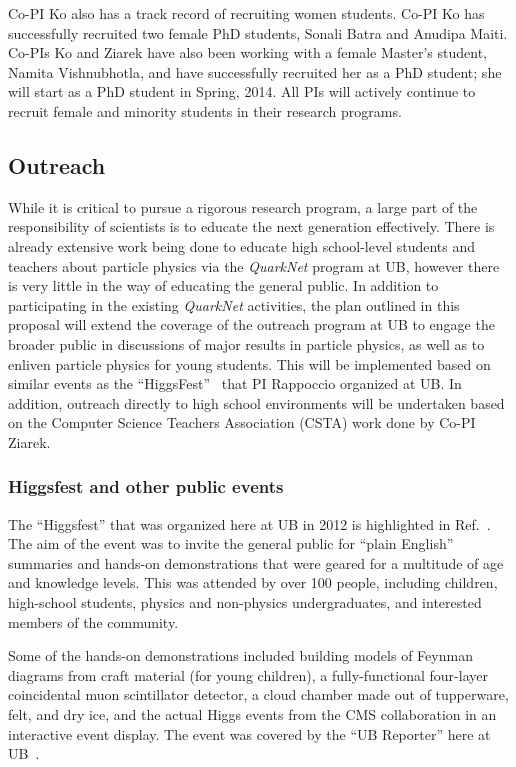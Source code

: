 \documentclass[times,11pt]{article}
\begin{document}
Co-PI Ko also has a track record of recruiting women students. Co-PI Ko has
successfully recruited two female PhD students, Sonali Batra and Anudipa
Maiti. Co-PIs Ko and Ziarek have also been working with a female Master's
student, Namita Vishnubhotla, and have successfully recruited her as a PhD
student; she will start as a PhD student in Spring, 2014. All PIs will
actively continue to recruit female and minority students in their research
programs.

\subsection{Outreach}

While it is critical to pursue a rigorous research program, a large
part of the responsibility of scientists is to educate the next
generation effectively. There is already extensive work being done to
educate high school-level students and teachers about particle physics
via the {\em QuarkNet}
program  at UB, however there is
very little in the way of educating the general
public. 
In addition to participating in the existing {\em QuarkNet}
activities, the plan outlined in this proposal will extend the coverage of the
outreach program at UB to engage the broader
public in discussions of major results in particle
physics, as well as to enliven particle physics for young students. 
This will be implemented based on similar events as the
``HiggsFest''~\cite{higgsfest} that PI Rappoccio organized at UB. 
In addition, outreach directly to high school environments will be
undertaken based on the Computer Science Teachers Association (CSTA)
work done by Co-PI Ziarek. 


\subsubsection{Higgsfest and other public events}

The ``Higgsfest'' that was organized here at UB in 2012
is highlighted in Ref.~\cite{higgsfest}. The aim of the event was to
invite the general public for ``plain English'' summaries and hands-on
demonstrations that were geared for a multitude of age and knowledge
levels. 
This was attended by over 100 people, including children,
high-school students, physics and non-physics undergraduates, and
interested members of the community. 

Some of the hands-on demonstrations included building models of
Feynman diagrams from craft material (for young children), a
fully-functional four-layer coincidental muon scintillator detector,
a cloud chamber made out of tupperware, felt, and dry ice, and the
actual Higgs events from the CMS collaboration in an interactive event
display. 
The event was covered by the ``UB Reporter'' here at
UB~\cite{higgsfest_ubreporter}. 
\end{document}

